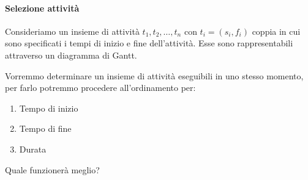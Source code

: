 \paragraph{Selezione attività}

Consideriamo un insieme di attività $t_1, t_2, \ldots , t_n$ con $t_i = (s_i, f_i)$ coppia in cui sono specificati i tempi di inizio e fine dell'attività. Esse sono rappresentabili attraverso un diagramma di Gantt.



Vorremmo determinare un insieme di attività eseguibili in uno stesso momento, per farlo potremmo procedere all'ordinamento per:

\begin{enumerate}
\item Tempo di inizio
\item Tempo di fine
\item Durata
\end{enumerate}

Quale funzionerà meglio?
